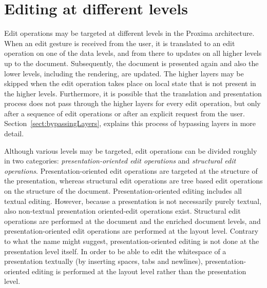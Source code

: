 

\section{Editing at different levels}

Edit operations may be targeted at different levels in the Proxima architecture. When an edit gesture is received from the user, it is translated to an edit operation on one of the data levels, and from there to updates on all higher levels up to the document. Subsequently, the document is presented again and also the lower levels, including the rendering, are updated. The higher layers may be skipped when the edit operation takes place on local state that is not present in the higher levels. Furthermore, it is possible that the translation and presentation process does not pass through the higher layers for every edit operation, but only after a sequence of edit operations or after an explicit request from the user. Section~\ref{sect:bypassingLayers}, explains this process of bypassing layers in more detail.



Although various levels may be targeted, edit operations can be divided roughly in two categories: {\em presentation-oriented edit operations} and {\em structural edit operations}. Presentation-oriented edit operations are targeted at the structure of the presentation, whereas structural edit operations are tree based edit operations on the structure of the document.  Presentation-oriented editing includes all textual editing. However, because a presentation is not necessarily purely textual, also non-textual presentation oriented-edit operations exist. Structural edit operations are performed at the document and the enriched document levels, and presentation-oriented edit operations are performed at the layout level. Contrary to what the name might suggest, presentation-oriented editing is not done at the presentation level itself. In order to be able to edit the whitespace of a presentation textually (by inserting spaces, tabs and newlines), presentation-oriented editing is performed at the layout level rather than the presentation level. 


